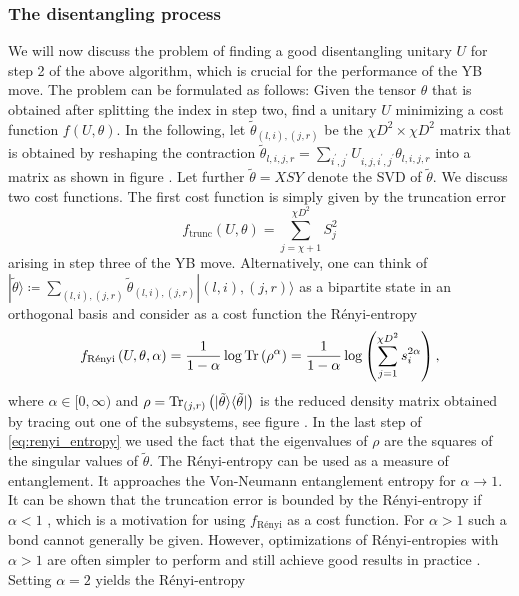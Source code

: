 \subsubsection*{The disentangling process}
We will now discuss the problem of finding a good disentangling unitary $U$ for step 2 of the above algorithm, which is crucial for the performance of the YB move. The problem can be formulated as follows: Given the tensor $\theta$ that is obtained after splitting the index in step two, find a unitary $U$ minimizing a cost function $f(U, \theta)$. In the following, let $\tilde{\theta}_{(l,i),(j,r)}$ be the $\chi D^2\times \chi D^2$ matrix that is obtained by reshaping the contraction $\tilde{\theta}_{l,i,j,r} = \sum_{i^\prime,j^\prime} U_{i,j,i^\prime,j^\prime}\theta_{l,i,j,r}$ into a matrix as shown in figure . Let further $\tilde{\theta} = XSY$ denote the SVD of $\tilde{\theta}$. We discuss two cost functions. The first cost function is simply given by the truncation error
\begin{equation}
	\label{eq:YB_move_disent_cost_function_truncation_error}
	f_\text{trunc}\left(U,\theta\right) = \sum_{j = \chi+1}^{\chi D^2}S_j^2
\end{equation}
arising in step three of the YB move. Alternatively, one can think of $|\tilde{\theta}\rangle \coloneqq \sum_{(l,i), (j,r)}\tilde{\theta}_{(l,i),(j,r)}|(l,i), (j, r)\rangle$ as a bipartite state in an orthogonal basis and consider as a cost function the Rényi-entropy
\begin{equation}
	\label{eq:renyi_entropy}
	f_\text{Rényi}\left(U,\theta,\alpha\right) = \frac{1}{1-\alpha}\log\operatorname{Tr}\left(\rho^\alpha\right) = \frac{1}{1-\alpha}\log\left(\sum_{j=1}^{\chi D^2}s_i^{2\alpha}\right),
\end{equation}
where $\alpha\in[0,\infty)$ and $\rho = \operatorname{Tr}_{(j, r)}\left(|\tilde{\theta}\rangle\langle\tilde{\theta}|\right)$ is the reduced density matrix obtained by tracing out one of the subsystems, see figure . In the last step of \eqref{eq:renyi_entropy} we used the fact that the eigenvalues of $\rho$ are the squares of the singular values of $\tilde{\theta}$. The Rényi-entropy can be used as a measure of entanglement. It approaches the Von-Neumann entanglement entropy for $\alpha\rightarrow 1$. It can be shown that the truncation error is bounded by the Rényi-entropy if $\alpha < 1$ \cite{cite:mps_represent_ground_states_faithfully}, which is a motivation for using $f_\text{Rényi}$ as a cost function. For $\alpha > 1$ such a bond cannot generally be given. However, optimizations of Rényi-entropies with $\alpha > 1$ are often simpler to perform and still achieve good results in practice \cite{cite:isometric_tensor_network_states_in_two_dimensions, cite:efficient_simulation_of_dynamics_in_two_dimensional_quantum_spin_systems, cite:finding_purifications_with_minimal_entanglement}. Setting $\alpha = 2$ yields the Rényi-entropy
